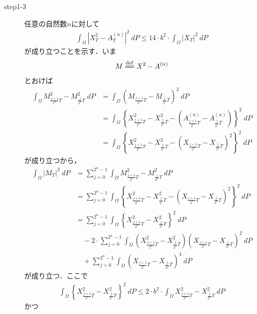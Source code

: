 \begin{sketch}
\begin{description}
			\item[step1-3]
				任意の自然数$n$に対して
				\begin{align}
					\int_\Omega \left|X_T^2 - A_T^{(n)}\right|^2\ dP
					\leq 14 \cdot b^2 \cdot \int_\Omega \left|X_T\right|^2\ dP
				\end{align}
				が成り立つことを示す．いま
				\begin{align}
					M \defeq X^2 - A^{(n)}
				\end{align}
				とおけば
				\begin{align}
					\int_\Omega M_{\frac{j+1}{2^n}T}^2 - M_{\frac{j}{2^n}T}^2\ dP
					&= \int_\Omega \left(M_{\frac{j+1}{2^n}T} - M_{\frac{j}{2^n}T} \right)^2\ dP \\
					&= \int_\Omega \left\{ X^2_{\frac{j+1}{2^n}T} - X^2_{\frac{j}{2^n}T} -
					\left(A^{(n)}_{\frac{j+1}{2^n}T} - A^{(n)}_{\frac{j}{2^n}T}\right) \right\}^2\ dP \\
					&= \int_\Omega \left\{ X^2_{\frac{j+1}{2^n}T} - X^2_{\frac{j}{2^n}T} -
					\left(X_{\frac{j+1}{2^n}T} - X_{\frac{j}{2^n}T}\right)^2 \right\}^2\ dP
				\end{align}
				が成り立つから，
				\begin{align}
					\int_\Omega \left|M_T\right|^2\ dP
					&= \sum_{j=0}^{2^n-1} \int_\Omega M_{\frac{j+1}{2^n}T}^2 - M_{\frac{j}{2^n}T}^2\ dP \\
					&= \sum_{j=0}^{2^n-1} \int_\Omega \left\{ X^2_{\frac{j+1}{2^n}T} - X^2_{\frac{j}{2^n}T} -
					\left(X_{\frac{j+1}{2^n}T} - X_{\frac{j}{2^n}T}\right)^2 \right\}^2\ dP \\
					&= \sum_{j=0}^{2^n-1} \int_\Omega \left\{ X^2_{\frac{j+1}{2^n}T} - X^2_{\frac{j}{2^n}T} \right\}^2\ dP \\
						&\quad - 2 \cdot \sum_{j=0}^{2^n-1} \int_\Omega \left( X^2_{\frac{j+1}{2^n}T} - X^2_{\frac{j}{2^n}T} \right) \left(X_{\frac{j+1}{2^n}T} - X_{\frac{j}{2^n}T}\right)^2\ dP \\
						&\quad + \sum_{j=0}^{2^n-1} \int_\Omega \left(X_{\frac{j+1}{2^n}T} - X_{\frac{j}{2^n}T}\right)^4\ dP
					\label{fom:thm_decomposition_of_local_martingales_1}
				\end{align}
				が成り立つ．ここで
				\begin{align}
					\int_\Omega \left\{ X^2_{\frac{j+1}{2^n}T} - X^2_{\frac{j}{2^n}T} \right\}^2\ dP
					\leq 2 \cdot b^2 \cdot \int_\Omega X^2_{\frac{j+1}{2^n}T} - X^2_{\frac{j}{2^n}T}\ dP
				\end{align}
				かつ
				\begin{align}

\end{align}
\end{description}
\end{sketch}
